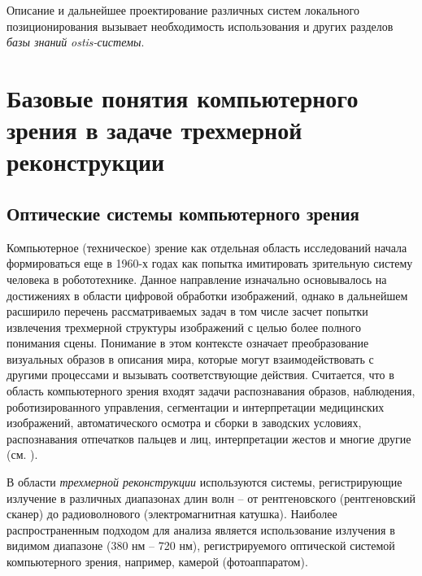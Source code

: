 Описание и дальнейшее проектирование различных систем локального позиционирования вызывает необходимость использования и других разделов \textit{базы знаний} \textit{ostis-системы}. 

\section{Базовые понятия компьютерного зрения в задаче трехмерной реконструкции}
\label{sec_3d_models_computervision}

\subsection{Оптические системы компьютерного зрения}

Компьютерное (техническое) зрение как отдельная область исследований начала формироваться еще в 1960-х годах как попытка имитировать зрительную систему человека в робототехнике. Данное направление изначально основывалось на достижениях в области цифровой обработки изображений, однако в дальнейшем расширило перечень рассматриваемых задач в том числе засчет попытки извлечения трехмерной структуры изображений с целью более полного понимания сцены. Понимание в этом контексте означает преобразование визуальных образов в описания мира, которые могут взаимодействовать с другими процессами и вызывать соответствующие действия. Считается, что в область компьютерного зрения входят задачи распознавания образов, наблюдения, роботизированного управления, сегментации и интерпретации медицинских изображений, автоматического осмотра и сборки в заводских условиях, распознавания отпечатков пальцев и лиц, интерпретации жестов и многие другие (см. ).

\begin{SCn}
\end{SCn}

В области \textit{трехмерной реконструкции} используются системы, регистрирующие излучение в различных диапазонах длин волн -- от рентгеновского (рентгеновский сканер) до радиоволнового (электромагнитная катушка). Наиболее распространенным подходом для анализа является использование излучения в видимом диапазоне (380 нм -- 720 нм), регистрируемого оптической системой компьютерного зрения, например, камерой (фотоаппаратом). 

